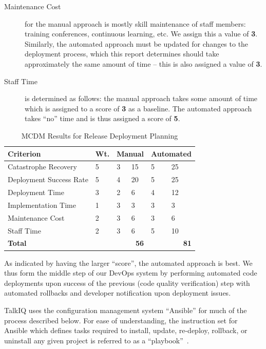 \documentclass[12pt]{article}
\begin{document}
\begin{description}
\item[Maintenance Cost] for the manual approach is mostly skill maintenance of staff members: training conferences, continuous learning, etc. We assign this a value of {\bf 3}. Similarly, the automated approach must be updated for changes to the deployment process, which this report determines should take approximately the same amount of time -- this is also assigned a value of {\bf 3}.
\item[Staff Time] is determined as follows: the manual approach takes some amount of time which is assigned to a score of {\bf 3} as a baseline. The automated approach takes ``no'' time and is thus assigned a score of {\bf 5}.
\end{description}

\begin{table}[ht]
\caption{MCDM Results for Release Deployment Planning}
\label{tbl:mcdm-rdp}
\centering
\begin{tabular}{|p{5.0cm}|p{0.65cm}|p{0.5cm}|p{0.5cm}|p{0.8cm}|p{0.8cm}|}
    \hline
    {\bf Criterion} & {\bf Wt.} & \multicolumn{2}{|p{1cm}|}{{\bf Manual}} & \multicolumn{2}{|p{1.6cm}|}{{\bf \mbox{Automated}}} \\
    \hline
    \hline
    Catastrophe Recovery    &  5 & 3 & 15 & 5 & 25 \\
    Deployment Success Rate &  5 & 4 & 20 & 5 & 25 \\
    Deployment Time         &  3 & 2 &  6 & 4 & 12 \\
    Implementation Time     &  1 & 3 &  3 & 3 &  3 \\
    Maintenance Cost        &  2 & 3 &  6 & 3 &  6 \\
    Staff Time              &  2 & 3 &  6 & 5 & 10 \\
    \hline
    \hline
    {\bf Total}             &    & \multicolumn{2}{|r|}{{\bf 56}} & \multicolumn{2}{|r|}{{\bf 81}} \\
    \hline
\end{tabular}
\end{table}

As indicated by having the larger ``score'', the automated approach is best. We thus form the middle step of our DevOps system by performing automated code deployments upon success of the previous (code quality verification) step with automated rollbacks and developer notification upon deployment issues.

TalkIQ uses the configuration management system ``Ansible'' for much of the process described below. For ease of understanding, the instruction set for Ansible which defines tasks required to install, update, re-deploy, rollback, or uninstall any given project is referred to as a ``playbook''~\cite{playbooks}.
\end{document}
